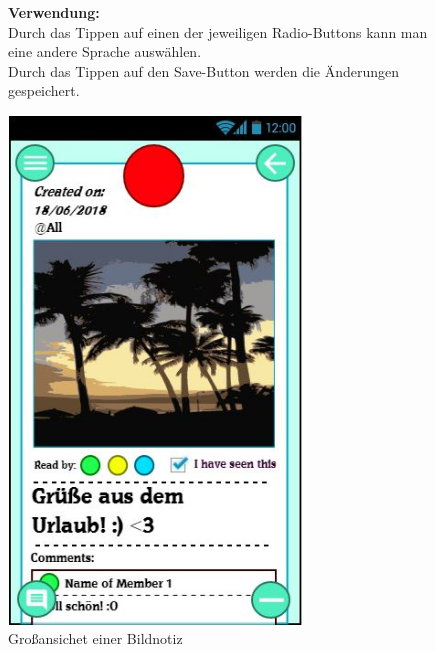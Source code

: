 \documentclass[a4paper]{scrreprt}
\begin{document}
\begin{figure}[h!]
\begin{minipage}[t]{0.6\linewidth}
\begin{itemize}
    			\end{itemize}
    			
    			\hfill 
    			
    			\textbf{Verwendung:}\\
    			Durch das Tippen auf einen der jeweiligen
    			Radio-Buttons kann man eine andere Sprache
    			auswählen.\\
    			Durch das Tippen auf den
    			Save-Button werden die Änderungen
    			gespeichert.
    			
    			
    		\end{minipage}
    	\end{figure}
    	
    	\clearpage
    	
    	\begin{figure}[h!]
    		\begin{minipage}[t]{0.4\linewidth}
    			\flushright
    			\centering
    			\vspace{9mm}
    			\includegraphics[width=0.7\textwidth]{fridget_picnotebig.JPG}
    			\caption{Großansichet einer Bildnotiz}
    			\label{fig:figure1}

\end{minipage}
\end{figure}
\end{document}
